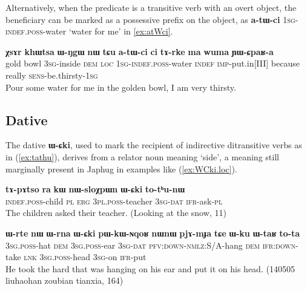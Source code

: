 \documentclass[oldfontcommands,oneside,a4paper,11pt]{article}
\newcommand{\ipa}[1]{\mbox{\phon\textbf{#1}}} %
\begin{document}
Alternatively, when the predicate is a transitive verb with an overt object, the beneficiary can be marked as a possessive prefix on the object, as 	\ipa{a-tɯ-ci} \textsc{1sg-indef.poss}-water `water for me' in \ref{ex:atWci}.

\begin{exe}
\ex \label{ex:atWci}
\gll \ipa{χsɤr}  	\ipa{khɯtsa}  	\ipa{ɯ-ŋgɯ}  	\ipa{nɯ}  	\ipa{tɕu}  	\ipa{a-tɯ-ci}  	\ipa{ci}  	\ipa{tɤ-rke}  	\ipa{ma}  	\ipa{wuma}  	\ipa{ɲɯ-ɕpaʁ-a}  \\
gold bowl \textsc{3sg}-inside \textsc{dem} \textsc{loc} \textsc{1sg-indef.poss}-water \textsc{indef} \textsc{imp}-put.in[III] because really \textsc{sens}-be.thirsty-\textsc{1sg} \\
\glt Pour some water for me in the golden bowl, I am very thirsty.
\end{exe}

\subsection{Dative}  \label{sec:dat}
The dative \ipa{ɯ-ɕki}, used to mark the recipient of indirective ditransitive verbs as in (\ref{ex:tathu}), derives from a relator noun  meaning `side', a meaning still marginally present in Japhug in examples like (\ref{ex:WCki.loc}).

 \begin{exe}
   \ex   \label{ex:tathu}
 \gll \ipa{tɤ-pɤtso}  	\ipa{ra}  	\ipa{kɯ}  	\ipa{nɯ-sloχpɯn}  	\ipa{ɯ-ɕki}  	\ipa{to-tʰu-nɯ}  \\
\textsc{indef.poss}-child \textsc{pl} \textsc{erg} \textsc{3pl.poss}-teacher \textsc{3sg-dat} \textsc{ifr}-ask-\textsc{pl} \\
\glt The children asked their teacher. (Looking at the snow, 11)
   \end{exe}  

\begin{exe}
\ex \label{ex:WCki.loc}
\gll \ipa{ɯ-rte} 	\ipa{nɯ} 	\ipa{ɯ-rna} 	\ipa{ɯ-ɕki} 	\ipa{pɯ-kɯ-ɴqoʁ} 	\ipa{nɯnɯ} 	\ipa{pjɤ-mɟa} 	\ipa{tɕe} 	\ipa{ɯ-ku} 	\ipa{ɯ-taʁ} 	\ipa{to-ta} \\
\textsc{3sg.poss}-hat \textsc{dem} \textsc{3sg.poss}-ear \textsc{3sg}-\textsc{dat} \textsc{pfv:down-nmlz}:S/A-hang \textsc{dem} \textsc{ifr:down}-take \textsc{lnk} \textsc{3sg.poss}-head \textsc{3sg}-on \textsc{ifr}-put \\
\glt He took the hard that was hanging on his ear and put it on his head. (140505 liuhaohan zoubian tianxia, 164)
\end{exe}
\end{document}
